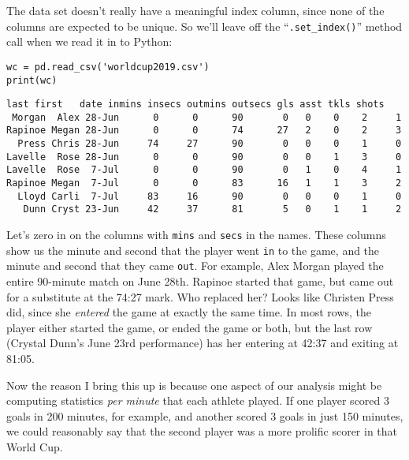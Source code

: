 
The data set doesn't really have a meaningful index column, since none of the
columns are expected to be unique. So we'll leave off the
``\texttt{.set\_index()}'' method call when we read it in to Python:

\begin{samepage}
\begin{Verbatim}[fontsize=\footnotesize,samepage=true,frame=single,framesep=3mm]
wc = pd.read_csv('worldcup2019.csv')
print(wc)
\end{Verbatim}
\vspace{-.2in}

\begin{Verbatim}[fontsize=\scriptsize,samepage=true,frame=leftline,framesep=5mm,framerule=1mm]
   last first   date inmins insecs outmins outsecs gls asst tkls shots
 Morgan  Alex 28-Jun      0      0      90       0   0    0    2     1
Rapinoe Megan 28-Jun      0      0      74      27   2    0    2     3
  Press Chris 28-Jun     74     27      90       0   0    0    1     0
Lavelle  Rose 28-Jun      0      0      90       0   0    1    3     0
Lavelle  Rose  7-Jul      0      0      90       0   1    0    4     1
Rapinoe Megan  7-Jul      0      0      83      16   1    1    3     2
  Lloyd Carli  7-Jul     83     16      90       0   0    0    1     0
   Dunn Cryst 23-Jun     42     37      81       5   0    1    1     2
\end{Verbatim}
\end{samepage}


Let's zero in on the columns with \texttt{mins} and \texttt{secs} in the names.
These columns show us the minute and second that the player went \texttt{in} to
the game, and the minute and second that they came \texttt{out}. For example,
Alex Morgan played the entire 90-minute match on June 28th. Rapinoe started
that game, but came out for a substitute at the 74:27 mark. Who replaced her?
Looks like Christen Press did, since she \textit{entered} the game at exactly
the same time. In most rows, the player either started the game, or ended the
game or both, but the last row (Crystal Dunn's June 23rd performance) has her
entering at 42:37 and exiting at 81:05.

Now the reason I bring this up is because one aspect of our analysis might be
computing statistics \textit{per minute} that each athlete played. If one
player scored 3 goals in 200 minutes, for example, and another scored 3 goals
in just 150 minutes, we could reasonably say that the second player was a more
prolific scorer in that World Cup.

